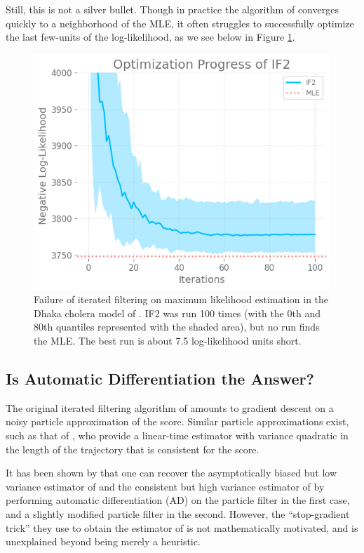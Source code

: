 \documentclass{article}
\begin{document}
Still, this is not a silver bullet. Though in practice the algorithm of \citet{ionides15} converges quickly to a neighborhood of the MLE, it often struggles to successfully optimize the last few-units of the log-likelihood, as we see below in Figure \ref{fig:if2fail}.

\begin{figure}[htbp!]
    \centering
    \includegraphics[scale=0.5]{imgs/095/if2fail.png}
    \caption{Failure of iterated filtering on maximum likelihood estimation in the Dhaka cholera model of \cite{king08}. IF2 was run 100 times (with the 0th and 80th quantiles represented with the shaded area), but no run finds the MLE. The best run is about 7.5 log-likelihood units short. }
    \label{fig:if2fail}
\end{figure}

\subsection{Is Automatic Differentiation the Answer?}

The original iterated filtering algorithm of \cite{ionides06-pnas} amounts to gradient descent on a noisy particle approximation of the score. Similar particle approximations exist, such as that of \cite{poyiadjis11}, who provide a linear-time estimator with variance quadratic in the length of the trajectory that is consistent for the score. 

It has been shown by \cite{scibior21} that one can recover the asymptotically biased but low variance estimator of \cite{blei2018vsmc} and the consistent but high variance estimator of \cite{poyiadjis11} by performing automatic differentiation (AD) on the particle filter in the first case, and a slightly modified particle filter in the second. However, the ``stop-gradient trick'' they use to obtain the estimator of \cite{poyiadjis11} is not mathematically motivated, and is unexplained beyond being merely a heuristic. 
\end{document}
